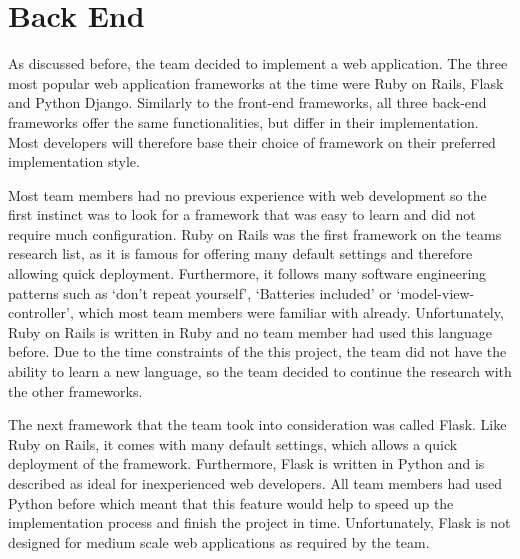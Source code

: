 \documentclass{l3proj}
\begin{document}
\section{Back End}
\par
As discussed before, the team decided to implement a web application. The three most popular web application frameworks at the time were Ruby on Rails, Flask and Python Django. Similarly to the front-end frameworks, all three back-end frameworks offer the same functionalities, but differ in their implementation. Most developers will therefore base their choice of framework on their preferred implementation style.\\
\par
Most team members had no previous experience with web development so the first instinct was to look for a framework that was easy to learn and did not require much configuration. Ruby on Rails was the first framework on the teams research list, as it is famous for offering many default settings and therefore allowing quick deployment. Furthermore, it follows many software engineering patterns such as `don't repeat yourself', `Batteries included' or `model-view-controller', which most team members were familiar with already. Unfortunately, Ruby on Rails is written in Ruby and no team member had used this language before. Due to the time constraints of the this project, the team did not have the ability to learn a new language, so the team decided to continue the research with the other frameworks.\\
\par
The next framework that the team took into consideration was called Flask. Like Ruby on Rails, it comes with many default settings, which allows a quick deployment of the framework. Furthermore, Flask is written in Python and is described as ideal for inexperienced web developers. All team members had used Python before which meant that this feature would help to speed up the implementation process and finish the project in time. Unfortunately, Flask is not designed for medium scale web applications as required by the team.\\
\par
\end{document}
